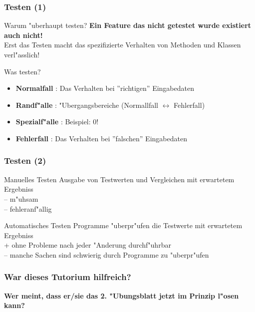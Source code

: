 \documentclass{beamer}
\begin{document}
\begin{frame}
\frametitle{Testen (1)}
\begin{block}{Warum "uberhaupt testen?}
\pause
\textbf{\glqq Ein Feature das nicht getestet wurde existiert auch nicht!\grqq} \\[1em]
Erst das Testen macht das spezifizierte Verhalten von Methoden und Klassen verl"asslich!
\end{block}

\pause

\begin{block}{Was testen?}
\begin{itemize}
\item \textbf{Normalfall} : Das Verhalten bei  ''richtigen'' Eingabedaten
\item \textbf{Randf"alle} : "Ubergangsbereiche (Normallfall $\leftrightarrow$ Fehlerfall)
\item \textbf{Spezialf"alle} : Beispiel: 0!
\item \textbf{Fehlerfall} : Das Verhalten bei ''falschen'' Eingabedaten
\end{itemize}
\end{block}
\end{frame}


\begin{frame}
\frametitle{Testen (2)}
\begin{block}{Manuelles Testen}
Ausgabe von Testwerten und Vergleichen mit erwartetem Ergebniss\\[1em]
-- m"uhsam\\
-- fehleranf"allig
\end{block}

\begin{block}{Automatisches Testen}
Programme "uberpr"ufen die Testwerte mit erwartetem Ergebniss\\[1em]
+ ohne Probleme nach jeder "Anderung durchf"uhrbar\\
-- manche Sachen sind schwierig durch Programme zu "uberpr"ufen
\end{block}
\end{frame}


\begin{frame}
\frametitle{War dieses Tutorium hilfreich?}
\begin{center}
\textbf{\Huge Wer meint, dass er/sie das 2. "Ubungsblatt jetzt im Prinzip l"osen kann?}
\end{center}
\end{frame}
\end{document}
